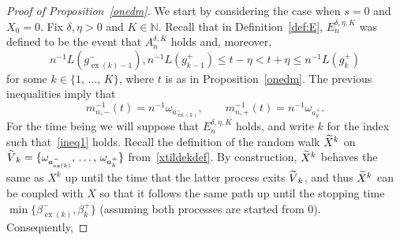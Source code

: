 \documentclass[10pt]{amsart}
\theoremstyle{definition}\newtheorem{defi}[theo]{Definition}\newtheorem{rema}[theo]{Remark}\newtheorem{exam}[theo]{Example}\newtheorem{exem}[theo]{Example}\newtheorem{nota}[theo]{Notation}
\newcommand{\N}{\mathbb N}
\newcommand\ex{\operatorname{ex}}
\newcommand{\aat}[1]{a_{\ex(#1)}^-}
\newcommand{\gtt}[1]{g_{\ex(#1)-1}^-}
\newcommand{\betat}[1]{\beta^-_{\ex(#1)}}
\let\oldtilde\tilde
\renewcommand*{\tilde}[1]{\mathchoice{\widetilde{#1}}{\widetilde{#1}}{\oldtilde{#1}}{\oldtilde{#1}}}
\begin{document}
\begin{proof}[Proof of Proposition~\ref{onedm}] We start by considering the case when $s=0$ and $X_0=0$. Fix $\delta,\eta>0$ and $K\in\N$. Recall that in Definition~\ref{def:E}, $E_n^{\delta,\eta,K}$ was defined to be the event that $A_n^{\delta,K}$ holds and, moreover,
\begin{equation}\label{ineq1}
n^{-1}L\left(\gtt{k}\right),n^{-1}L\left(g_{k-1}^+\right)\leq t-\eta<t+\eta\leq n^{-1}L\left(g_{k}^+\right)
\end{equation}
for some $k\in\{1,\,\dots,\,K\}$, where $t$ is as in Proposition~\ref{onedm}. The previous inequalities imply that
\begin{equation}\label{ddddd}
m_{n,-}^{-1}(t)=n^{-1}\omega_{\aat{k}},\qquad m_{n,+}^{-1}(t)=n^{-1}\omega_{a_k^+}.
\end{equation}
For the time being we will suppose that $E_n^{\delta,\eta,K}$ holds, and write $k$ for the index such that~\eqref{ineq1} holds. Recall the definition of the random walk $\tilde{X}^k$ on $\tilde{V}_k=\{\omega_{\aat{k}},\,\dots,\,\omega_{a_k^+}\}$ from~\eqref{xtildekdef}. By construction, $\tilde{X}^k$ behaves the same as $X^k$ up until the time that the latter process exits $\tilde{V}_k$, and thus $\tilde{X}^k$ can be coupled with $X$ so that it follows the same path up until the stopping time $\min\{\betat{k},{\beta}_k^+\}$ (assuming both processes are started from 0). Consequently,


\end{proof}
\end{document}
